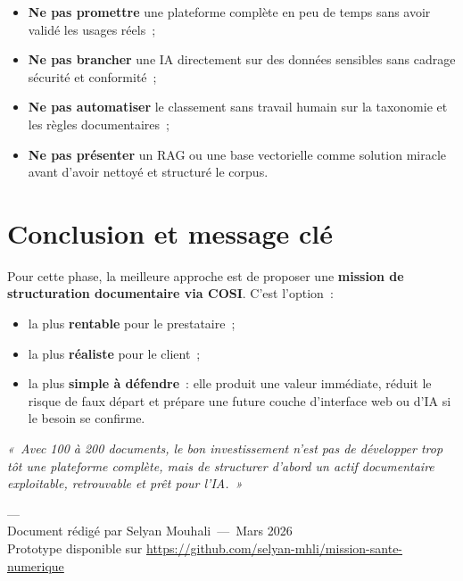 \documentclass[12pt, a4paper]{article}
\begin{document}
\begin{itemize}[leftmargin=1.5em]
  \item \textbf{Ne pas promettre} une plateforme complète en peu de temps sans avoir validé les usages réels~;
  \item \textbf{Ne pas brancher} une IA directement sur des données sensibles sans cadrage sécurité et conformité~;
  \item \textbf{Ne pas automatiser} le classement sans travail humain sur la taxonomie et les règles documentaires~;
  \item \textbf{Ne pas présenter} un RAG ou une base vectorielle comme solution miracle avant d'avoir nettoyé et structuré le corpus.
\end{itemize}

\section{Conclusion et message clé}

Pour cette phase, la meilleure approche est de proposer une \textbf{mission de structuration documentaire via COSI}. C'est l'option~:

\begin{itemize}[leftmargin=1.5em]
  \item la plus \textbf{rentable} pour le prestataire~;
  \item la plus \textbf{réaliste} pour le client~;
  \item la plus \textbf{simple à défendre}~: elle produit une valeur immédiate, réduit le risque de faux départ et prépare une future couche d'interface web ou d'IA si le besoin se confirme.
\end{itemize}

\begin{keybox}
\centering
\large\itshape
\textcolor{bleuprofond}{«~Avec 100 à 200 documents, le bon investissement n'est pas de développer trop tôt une plateforme complète, mais de structurer d'abord un actif documentaire exploitable, retrouvable et prêt pour l'IA.~»}
\end{keybox}

\vfill

\begin{center}
\small\textcolor{gris400}{---}\\[0.3em]
\small\textcolor{gris400}{Document rédigé par Selyan Mouhali~---~Mars 2026}\\[0.2em]
\small\textcolor{gris400}{Prototype disponible sur \url{https://github.com/selyan-mhli/mission-sante-numerique}}
\end{center}
\end{document}
